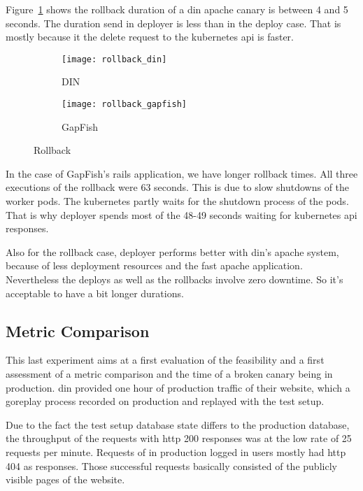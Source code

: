 Figure~\ref{fig:rollback_din} shows the rollback duration of a \gls{din} apache canary
is between 4 and 5 seconds. The duration send in deployer is less than in the deploy case.
That is mostly because it the delete request to the kubernetes api is faster.

\begin{figure}[htbp]
  \centering
  \begin{subfigure}{.5\textwidth}
    \texttt{[image: rollback\_din]}
    \caption[DIN]{DIN}
    \label{fig:rollback_din}
  \end{subfigure}%
  \begin{subfigure}{.5\textwidth}
    \texttt{[image: rollback\_gapfish]}
    \caption[GapFish]{GapFish}
    \label{fig:rollback_gapfish}
  \end{subfigure}
  \caption[Deploy]{Rollback}
\end{figure}

In the case of GapFish's rails application, we have longer rollback times. All three
executions of the rollback were 63 seconds. This is due to slow shutdowns of the worker
pods. The kubernetes partly waits for the shutdown process of the pods. That is why
deployer spends most of the 48-49 seconds waiting for kubernetes api responses.

Also for the rollback case, deployer performs better with \gls{din}'s apache system, because of
less deployment resources and the fast apache application. Nevertheless the deploys as
well as the rollbacks involve zero downtime. So it's acceptable to have a bit longer
durations.

\subsection{Metric Comparison}

This last experiment aims at a first evaluation of the feasibility and a first assessment
of a metric comparison and the time of a broken canary being in production. \gls{din}
provided one hour of production traffic of their website, which a goreplay process
recorded on production and replayed with the test setup.

Due to the fact the test setup database state differs to the production database, the
throughput of the requests with http 200 responses was at the low rate of 25 requests per
minute. Requests of in production logged in users mostly had http 404 as responses. Those
successful requests basically consisted of the publicly visible pages of the website.


